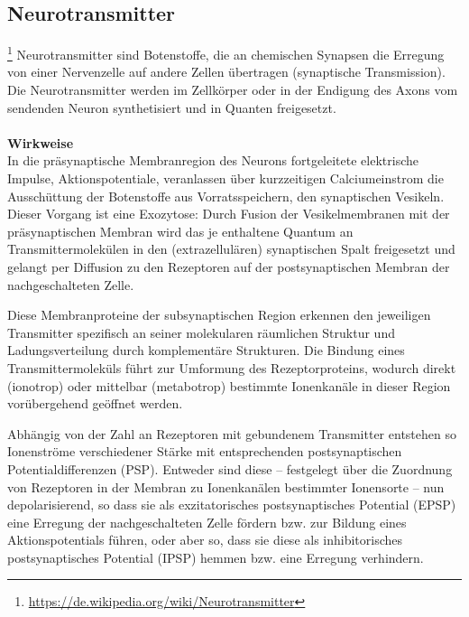 \subsection{Neurotransmitter}\footnote{\url{https://de.wikipedia.org/wiki/Neurotransmitter}} Neurotransmitter sind Botenstoffe, die an chemischen Synapsen die Erregung von einer Nervenzelle auf andere Zellen übertragen (synaptische Transmission).
Die Neurotransmitter werden im Zellkörper oder in der Endigung des Axons vom sendenden Neuron synthetisiert und in Quanten freigesetzt.
\\\\
\textbf{Wirkweise}\\
In die präsynaptische Membranregion des Neurons fortgeleitete elektrische Impulse, Aktionspotentiale, veranlassen über kurzzeitigen Calciumeinstrom die Ausschüttung der Botenstoffe aus Vorratsspeichern, den synaptischen Vesikeln. Dieser Vorgang ist eine Exozytose: Durch Fusion der Vesikelmembranen mit der präsynaptischen Membran wird das je enthaltene Quantum an Transmittermolekülen in den (extrazellulären) synaptischen Spalt freigesetzt und gelangt per Diffusion zu den Rezeptoren auf der postsynaptischen Membran der nachgeschalteten Zelle.

Diese Membranproteine der subsynaptischen Region erkennen den jeweiligen Transmitter spezifisch an seiner molekularen räumlichen Struktur und Ladungsverteilung durch komplementäre Strukturen. Die Bindung eines Transmittermoleküls führt zur Umformung des Rezeptorproteins, wodurch direkt (ionotrop) oder mittelbar (metabotrop) bestimmte Ionenkanäle in dieser Region vorübergehend geöffnet werden.

Abhängig von der Zahl an Rezeptoren mit gebundenem Transmitter entstehen so Ionenströme verschiedener Stärke mit entsprechenden postsynaptischen Potentialdifferenzen (PSP). Entweder sind diese – festgelegt über die Zuordnung von Rezeptoren in der Membran zu Ionenkanälen bestimmter Ionensorte – nun depolarisierend, so dass sie als exzitatorisches postsynaptisches Potential (EPSP) eine Erregung der nachgeschalteten Zelle fördern bzw. zur Bildung eines Aktionspotentials führen, oder aber so, dass sie diese als inhibitorisches postsynaptisches Potential (IPSP) hemmen bzw. eine Erregung verhindern.

